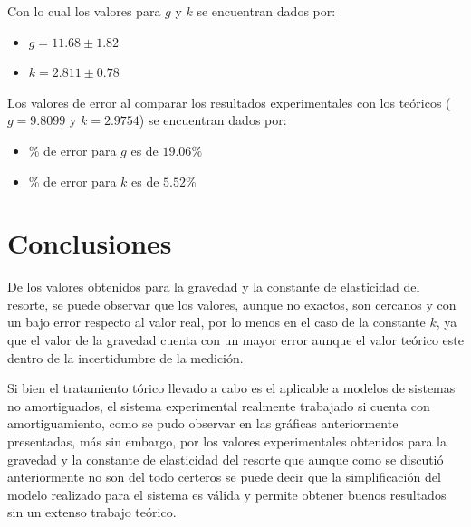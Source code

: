 \documentclass[10pt]{article}
\begin{document}
        Con lo cual los valores para $g$ y $k$ se encuentran dados por:

        \begin{itemize}
            \item $g = 11.68 \pm 1.82$
            \item $k = 2.811 \pm 0.78$
        \end{itemize}

        Los valores de error al comparar los resultados experimentales con los teóricos ($g = 9.8099$ y $k=2.9754$) se encuentran dados por:

        \begin{itemize}
            \item \% de error para $g$ es de $19.06\%$
            \item \% de error para $k$ es de $5.52\%$
        \end{itemize}

    \section{Conclusiones}
        De los valores obtenidos para la gravedad y la constante de elasticidad del resorte, se puede observar que los valores, aunque no exactos, son cercanos y con un bajo error respecto al valor real, por lo menos en el caso de la constante $k$, ya que el valor de la gravedad cuenta con un mayor error aunque el valor teórico este dentro de la incertidumbre de la medición.

        Si bien el tratamiento tórico llevado a cabo es el aplicable a modelos de sistemas no amortiguados, el sistema experimental realmente trabajado si cuenta con amortiguamiento, como se pudo observar en las gráficas anteriormente presentadas, más sin embargo, por los valores experimentales obtenidos para la gravedad y la constante de elasticidad del resorte que aunque como se discutió anteriormente no son del todo certeros se puede decir que la simplificación del modelo realizado para el sistema es válida y permite obtener buenos resultados sin un extenso trabajo teórico.
\end{document}
